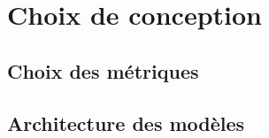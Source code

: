 \section{Choix de conception}

\subsection{Choix des métriques}

\subsection{Architecture des modèles}

